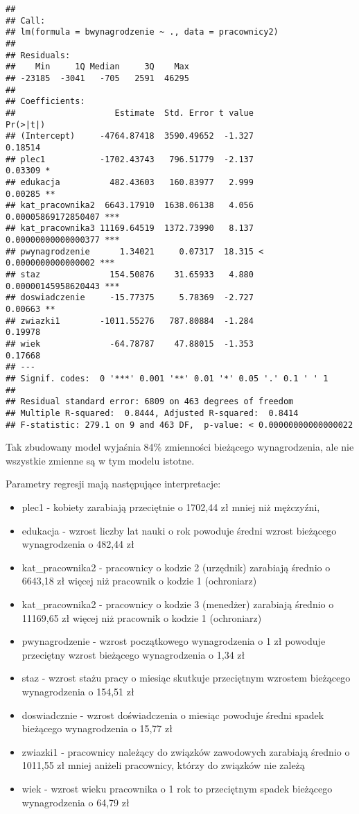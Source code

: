 \documentclass[]{book}
\providecommand{\tightlist}{%
  \setlength{\itemsep}{0pt}\setlength{\parskip}{0pt}}
\begin{document}
\begin{verbatim}
## 
## Call:
## lm(formula = bwynagrodzenie ~ ., data = pracownicy2)
## 
## Residuals:
##    Min     1Q Median     3Q    Max 
## -23185  -3041   -705   2591  46295 
## 
## Coefficients:
##                    Estimate  Std. Error t value             Pr(>|t|)    
## (Intercept)     -4764.87418  3590.49652  -1.327              0.18514    
## plec1           -1702.43743   796.51779  -2.137              0.03309 *  
## edukacja          482.43603   160.83977   2.999              0.00285 ** 
## kat_pracownika2  6643.17910  1638.06138   4.056  0.00005869172850407 ***
## kat_pracownika3 11169.64519  1372.73990   8.137  0.00000000000000377 ***
## pwynagrodzenie      1.34021     0.07317  18.315 < 0.0000000000000002 ***
## staz              154.50876    31.65933   4.880  0.00000145958620443 ***
## doswiadczenie     -15.77375     5.78369  -2.727              0.00663 ** 
## zwiazki1        -1011.55276   787.80884  -1.284              0.19978    
## wiek              -64.78787    47.88015  -1.353              0.17668    
## ---
## Signif. codes:  0 '***' 0.001 '**' 0.01 '*' 0.05 '.' 0.1 ' ' 1
## 
## Residual standard error: 6809 on 463 degrees of freedom
## Multiple R-squared:  0.8444, Adjusted R-squared:  0.8414 
## F-statistic: 279.1 on 9 and 463 DF,  p-value: < 0.00000000000000022
\end{verbatim}

Tak zbudowany model wyjaśnia 84\% zmienności bieżącego wynagrodzenia,
ale nie wszystkie zmienne są w tym modelu istotne.

Parametry regresji mają następujące interpretacje:

\begin{itemize}
\tightlist
\item
  plec1 - kobiety zarabiają przeciętnie o 1702,44 zł mniej niż
  mężczyźni,
\item
  edukacja - wzrost liczby lat nauki o rok powoduje średni wzrost
  bieżącego wynagrodzenia o 482,44 zł
\item
  kat\_pracownika2 - pracownicy o kodzie 2 (urzędnik) zarabiają średnio
  o 6643,18 zł więcej niż pracownik o kodzie 1 (ochroniarz)
\item
  kat\_pracownika2 - pracownicy o kodzie 3 (menedżer) zarabiają średnio
  o 11169,65 zł więcej niż pracownik o kodzie 1 (ochroniarz)
\item
  pwynagrodzenie - wzrost początkowego wynagrodzenia o 1 zł powoduje
  przeciętny wzrost bieżącego wynagrodzenia o 1,34 zł
\item
  staz - wzrost stażu pracy o miesiąc skutkuje przeciętnym wzrostem
  bieżącego wynagrodzenia o 154,51 zł
\item
  doswiadcznie - wzrost doświadczenia o miesiąc powoduje średni spadek
  bieżącego wynagrodzenia o 15,77 zł
\item
  zwiazki1 - pracownicy należący do związków zawodowych zarabiają
  średnio o 1011,55 zł mniej aniżeli pracownicy, którzy do związków nie
  zależą
\item
  wiek - wzrost wieku pracownika o 1 rok to przeciętnym spadek bieżącego
  wynagrodzenia o 64,79 zł
\end{itemize}
\end{document}
